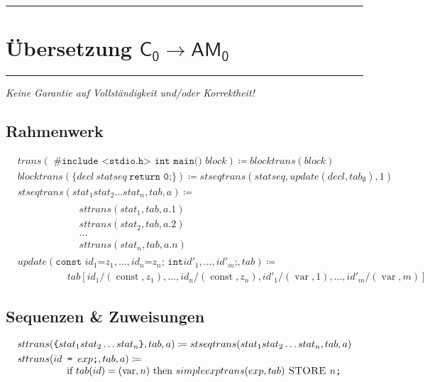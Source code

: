 \documentclass[ngerman,a4paper, 12pt, fleqn]{article}
\newcommand{\defeq}{\coloneqq}
\newcommand{\befehl}[1]{\textsc{#1}}
\begin{document}
	\hrule
	\vspace{-0.5\baselineskip}
	\section*{Übersetzung $\mathsf{C_0 \to AM_0}$}	
	\hrule
	\begin{center}
		\small \slshape Keine Garantie auf Vollständigkeit und/oder Korrektheit!
	\end{center}
	\bigskip
	
	\subsection*{Rahmenwerk}
	\begin{align*}
		&trans (\texttt{ \#\. include <stdio.h> int main() } block ) \defeq blocktrans(block) \\
		&blocktrans(\texttt{\{} decl \ statseq \ \texttt{return 0;}\texttt{\}}) \defeq stseqtrans(statseq, update(decl , tab_\emptyset ), 1) \\
		&stseqtrans(stat_1 stat_2 \dots stat_n , tab, a) \defeq \\[-3pt]
		&\hspace{5em}\begin{aligned}
			&sttrans(stat_1 , tab, a.1) \\[-3pt]
			&sttrans(stat_2 , tab, a.2) \\[-3pt]
			&... \\[-3pt]
			&sttrans(stat_n , tab, a.n)
		\end{aligned} \\
		&update( \texttt{const } id_1 \texttt{=} z_1 , \dots , id_n \texttt{=} z_n \texttt{; } \texttt{int} id'_1 , \dots , id'_m \texttt{;} , tab) \defeq \\[-3pt]
		&\hspace{5em}
		tab[id_1 / (\operatorname{const}, z_1 ), \dots , id_n /(\operatorname{const}, z_n), id'_1 /(\operatorname{var}, 1), \dots , id'_m /(\operatorname{var}, m)]	
	\end{align*}

	\subsection*{Sequenzen \& Zuweisungen}
	
	\begin{align*}		%
		&sttrans(\texttt{\{} stat_1 stat_2 \dots stat_n \texttt{\}}, tab, a) \defeq stseqtrans(stat_1 stat_2 \dots stat_n , tab, a) \\
		&sttrans(id \texttt{ = } exp\texttt{;}, tab, a) \defeq \\[-3pt]
		&\hspace{5em} \text{if } tab(id) = (\operatorname{var}, n) \text{ then } simpleexptrans(exp, tab) \befehl{ STORE } n\texttt{;}
	\end{align*}
\end{document}

